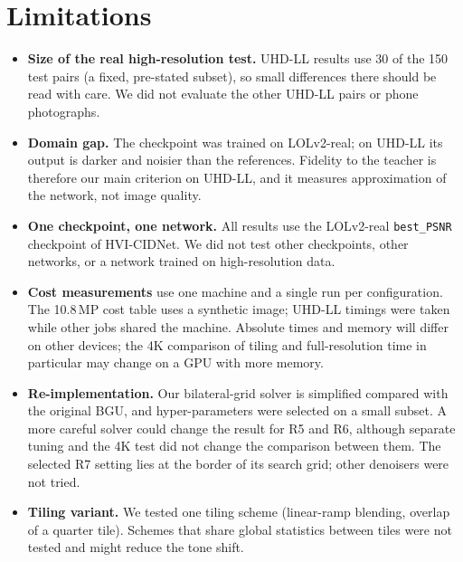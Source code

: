 \documentclass[runningheads]{llncs}
\begin{document}
\section{Limitations}\label{sec:limits}
\begin{itemize}
\item \textbf{Size of the real high-resolution test.} UHD-LL results use 30 of the 150 test pairs (a fixed, pre-stated subset), so small differences there should be read with care. We did not evaluate the other UHD-LL pairs or phone photographs.
\item \textbf{Domain gap.} The checkpoint was trained on LOLv2-real; on UHD-LL its output is darker and noisier than the references. Fidelity to the teacher is therefore our main criterion on UHD-LL, and it measures approximation of the network, not image quality.
\item \textbf{One checkpoint, one network.} All results use the LOLv2-real \texttt{best\_PSNR} checkpoint of HVI-CIDNet. We did not test other checkpoints, other networks, or a network trained on high-resolution data.
\item \textbf{Cost measurements} use one machine and a single run per configuration. The 10.8\,MP cost table uses a synthetic image; UHD-LL timings were taken while other jobs shared the machine. Absolute times and memory will differ on other devices; the 4K comparison of tiling and full-resolution time in particular may change on a GPU with more memory.
\item \textbf{Re-implementation.} Our bilateral-grid solver is simplified compared with the original BGU, and hyper-parameters were selected on a small subset. A more careful solver could change the result for R5 and R6, although separate tuning and the 4K test did not change the comparison between them. The selected R7 setting lies at the border of its search grid; other denoisers were not tried.
\item \textbf{Tiling variant.} We tested one tiling scheme (linear-ramp blending, overlap of a quarter tile). Schemes that share global statistics between tiles were not tested and might reduce the tone shift.
\end{itemize}

\end{document}
